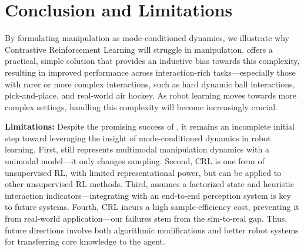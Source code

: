 \section{Conclusion and Limitations}
By formulating manipulation as mode-conditioned dynamics, we illustrate why Contrastive Reinforcement Learning will struggle in manipulation. \methodname{} offers a practical, simple solution that provides an inductive bias towards this complexity, resulting in improved performance across interaction-rich tasks---especially those with rarer or more complex interactions, such as hard dynamic ball interactions, pick-and-place, and real-world air hockey. As robot learning moves towards more complex settings, handling this complexity will become increasingly crucial.

\textbf{Limitations:} Despite the promising success of \methodname{}, it remains an incomplete initial step toward leveraging the insight of mode-conditioned dynamics in robot learning. First, \methodshort{} still represents multimodal manipulation dynamics with a unimodal model---it only changes sampling. Second, CRL is one form of unsupervised RL, with limited representational power, but \methodshort{} can be applied to other unsupervised RL methods. Third, \methodshort{} assumes a factorized state and heuristic interaction indicators---integrating \methodshort{} with an end-to-end perception system is key to future systems. Fourth, CRL incurs a high sample-efficiency cost, preventing it from real-world application---our failures stem from the sim-to-real gap. Thus, future directions involve both algorithmic modifications and better robot systems for transferring core knowledge to the agent.